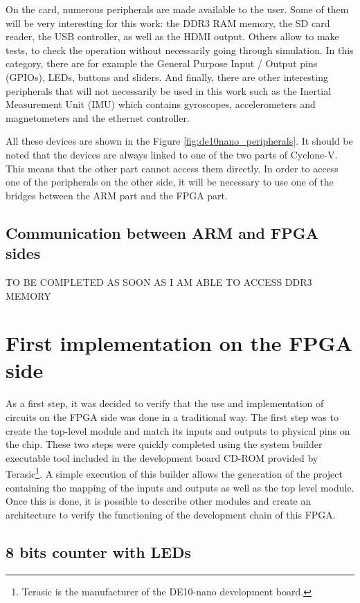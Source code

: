 \documentclass[12pt]{article}
\newcommand{\PF}[1]{\marginpar{\tiny PF: #1}}
\begin{document}
On the card, numerous peripherals are made available to the user. Some of them will be very interesting for this work: the DDR3 RAM memory, the SD card reader, the USB controller, as well as the HDMI output. Others allow to make tests, to check the operation without necessarily going through simulation. In this category, there are for example the General Purpose Input / Output pins (GPIOs), LEDs, buttons and sliders. And finally, there are other interesting peripherals that will not necessarily be used in this work such as the Inertial Measurement Unit (IMU) which contains gyroscopes, accelerometers and magnetometers and the ethernet controller.

\vspace{12pt}
All these devices are shown in the Figure \ref{fig:de10nano_peripherals}. It should be noted that the devices are always linked to one of the two parts of Cyclone-V. This means that the other part cannot access them directly. In order to access one of the peripherals on the other side, it will be necessary to use one of the bridges between the ARM part and the FPGA
part.

\subsection{Communication between ARM and FPGA sides}

TO BE COMPLETED AS SOON AS I AM ABLE TO ACCESS DDR3 MEMORY

\section{First implementation on the FPGA side}

As a first step, it was decided to verify that the use and implementation of circuits on the FPGA side was done in a traditional way. The first step was to create the top-level module and match its inputs and outputs to physical pins on the chip. These two steps were quickly completed using the system builder executable tool included in the development board CD-ROM provided by Terasic\footnote{Terasic is the manufacturer of the DE10-nano development board.}. A simple execution of this builder allows the generation of the project containing the mapping of the inputs and outputs as well as the top level module. Once this is done, it is possible to describe other modules and create an architecture to verify the functioning of the development chain of this FPGA.\PF{Please rephrase}

\subsection{8 bits counter with LEDs}
\end{document}
